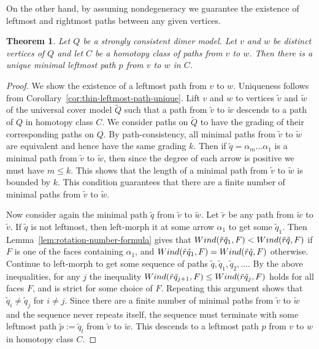 \documentclass{article}
\newtheorem{thm}{Theorem}[section]
\theoremstyle{definition}
\newcommand{\wind}{\textup{Wind}}
\begin{document}
On the other hand, by assuming nondegeneracy we guarantee the existence of leftmost and rightmost paths between any given vertices.
\begin{thm}\label{cor:c}
	Let $Q$ be a strongly consistent dimer model. Let $v$ and $w$ be distinct vertices of $Q$ and let $C$ be a homotopy class of paths from $v$ to $w$. Then there is a unique minimal leftmost path $p$ from $v$ to $w$ in $C$. 
\end{thm}
\begin{proof}
	We show the existence of a leftmost path from $v$ to $w$. Uniqueness follows from Corollary~\ref{cor:thin-leftmost-path-unique}. Lift $v$ and $w$ to vertices $\tilde v$ and $\tilde w$ of the universal cover model $\widetilde Q$ such that a path from $\tilde v$ to $\tilde w$ descends to a path of $Q$ in homotopy class $C$.
	We consider paths on $\widetilde Q$ to have the grading of their corresponding paths on $Q$.
	By path-consistency, all minimal paths from $\tilde v$ to $\tilde w$ are equivalent and hence have the same grading $k$. Then if $\tilde q=\alpha_m\dots\alpha_1$ is a minimal path from $\tilde v$ to $\tilde w$, then since the degree of each arrow is positive we must have $m\leq k$. This shows that the length of a minimal path from $\tilde v$ to $\tilde w$ is bounded by $k$. This condition guarantees that there are a finite number of minimal paths from $\tilde v$ to $\tilde w$.

	Now consider again the minimal path $\tilde q$ from $\tilde v$ to $\tilde w$. Let $\tilde r$ be any path from $\tilde w$ to $\tilde v$. 
	If $\tilde q$ is not leftmost, then left-morph it at some arrow $\alpha_1$ to get some $\tilde q_1$. Then Lemma~\ref{lem:rotation-number-formula} gives that
	$\wind(\tilde r\tilde q_1,F)<\wind(\tilde r\tilde q,F)$
		if $F$ is one of the faces containing $\alpha_1$, and
	$\wind(\tilde r\tilde q_1,F)=\wind(\tilde r\tilde q,F)$
	otherwise.
		Continue to left-morph to get some sequence of paths $\tilde q,\tilde q_1,\tilde q_2,\dots$. By the above inequalities, for any $j$ the inequality $\label{fdsdf}\wind(\tilde r\tilde q_{j+1},F)\leq\wind(\tilde r\tilde q_j,F)$ holds for all faces $F$, and is strict for some choice of $F$. Repeating this argument shows that $\tilde q_i\neq\tilde q_j$ for $i\neq j$.
	Since there are a finite number of minimal paths from $\tilde v$ to $\tilde w$ and the sequence never repeats itself, the sequence must terminate with some leftmost path $\tilde p:=\tilde q_l$ from $\tilde v$ to $\tilde w$. This descends to a leftmost path $p$ from $v$ to $w$ in homotopy class $C$.
\end{proof}
\end{document}

